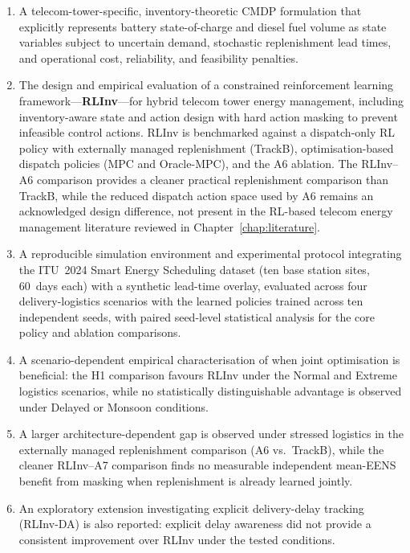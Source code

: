 \begin{enumerate}
  \item A telecom-tower-specific, inventory-theoretic CMDP formulation that
  explicitly represents battery state-of-charge and diesel fuel volume as
  state variables subject to uncertain demand, stochastic replenishment lead
  times, and operational cost, reliability, and feasibility penalties.

  \item The design and empirical evaluation of a constrained reinforcement
  learning framework---\textbf{RLInv}---for hybrid telecom tower energy
  management, including inventory-aware state and action design with hard
action masking to prevent infeasible control actions. RLInv is benchmarked against
  a dispatch-only RL policy with externally
  managed replenishment (TrackB), optimisation-based dispatch policies
  (MPC and Oracle-MPC), and the A6 ablation. The RLInv--A6
  comparison provides a cleaner practical replenishment comparison than
  TrackB, while the reduced dispatch action space used by A6 remains an
  acknowledged design difference, not present in
  the RL-based telecom energy management literature reviewed in
  Chapter~\ref{chap:literature}.

  \item A reproducible simulation environment and experimental protocol
  integrating the ITU~2024 Smart Energy Scheduling dataset (ten base station
  sites, 60~days each) with a synthetic lead-time overlay, evaluated across
  four delivery-logistics scenarios with the learned policies trained across
  ten independent seeds, with
  paired seed-level statistical analysis for the core policy and ablation
  comparisons.

  \item A scenario-dependent empirical characterisation of when joint
  optimisation is beneficial: the H1 comparison favours RLInv under the Normal
and Extreme logistics scenarios, while no statistically distinguishable advantage
  is observed under Delayed or Monsoon conditions.
  
   \item A larger architecture-dependent gap is observed under stressed
  logistics in the externally managed replenishment comparison
  (A6 vs.\ TrackB), while the cleaner RLInv--A7 comparison finds no
  measurable independent mean-EENS benefit from masking when
  replenishment is already learned jointly.

  \item An exploratory extension investigating explicit delivery-delay
  tracking (RLInv-DA) is also reported: explicit
  delay awareness did not provide a consistent improvement over RLInv under
  the tested conditions.
\end{enumerate}


